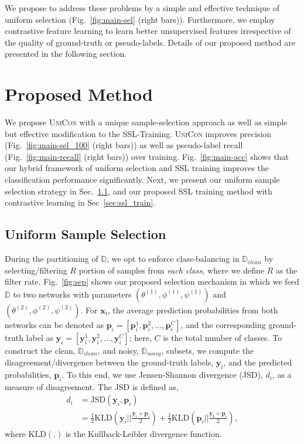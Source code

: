 \documentclass[10pt,twocolumn,letterpaper]{article}
\begin{document}
We propose to address these problems by a simple and effective technique of uniform selection (Fig.~\ref{fig:main-sel} (right bars)). Furthermore, we employ contrastive feature learning to learn better unsupervised features irrespective of the quality of ground-truth or pseudo-labels. 
Details of our proposed method are presented in the following section.  
\vspace{-1mm}
\section{Proposed Method}
We propose \textsc{UniCon} with a unique sample-selection approach as well as simple but effective modification to the SSL-Training.
\textsc{UniCon} improves precision (Fig.~\ref{fig:main-sel_100} (right bars)) as well as  pseudo-label recall (Fig.~\ref{fig:main-recall} (right bars)) over training. Fig.~\ref{fig:main-acc} shows that our hybrid framework of uniform selection and SSL training improves the classification performance significantly. Next, we present our uniform sample selection strategy in Sec.~\ref{sec:uni_sel}, and our proposed SSL training method with contrastive learning in Sec~\ref{sec:ssl_train}.





\subsection{Uniform Sample Selection}
\label{sec:uni_sel}
During the partitioning of $\mathbb{D}$, we opt to enforce class-balancing in $\mathbb{D}_{clean}$ by selecting/filtering $R$ portion of samples from {\it each class}, where we define $R$ as the filter rate. Fig.~\ref{fig:sep} shows our proposed selection mechanism in which we feed $\mathbb{D}$ to two networks with parameters $(\theta^{(1)}, \phi^{(1)}, \psi^{(1)})$ and $(\theta^{(2)}, \phi^{(2)}, \psi^{(2)})$. For $\mathbf{x}_i$, the average 
prediction probabilities from both networks can be denoted as $\mathbf{p}_i = [\mathbf{p}_{i}^{1}, \mathbf{p}_{i}^{2}, \ldots,\mathbf{p}_{i}^{C}]$, and the corresponding ground-truth label as $\mathbf{y}_i = [\mathbf{y}_{i}^{1}, \mathbf{y}_{i}^{2}, \ldots,\mathbf{y}_{i}^{C}]$; here, $C$ is the total number of classes.
To construct the clean, $\mathbb{D}_{clean}$, and noisy, $\mathbb{D}_{noisy}$, subsets, we compute the disagreement/divergence between the ground-truth labels, $\mathbf{y}_i$, and the predicted probabilities, $\mathbf{p}_i$. To this end, we use Jensen-Shannon divergence (JSD), $d_i$, as a measure of disagreement. The JSD is defined as, \begin{equation}\label{eq:JSD}
\begin{split}
    d_i & = \mathrm{JSD}(\mathbf{y}_i,\mathbf{p}_i) \\
       & = \frac{1}{2} \mathrm{KLD}(\mathbf{y}_i||\frac{\mathbf{y}_i+\mathbf{p}_i}{2}) + \frac{1}{2} \mathrm{KLD}(\mathbf{p}_i||\frac{\mathbf{y_i}+\mathbf{p}_i}{2}),
\end{split}
\end{equation}
where $\mathrm{KLD}(.)$ is the Kullback-Leibler divergence function.
\end{document}
